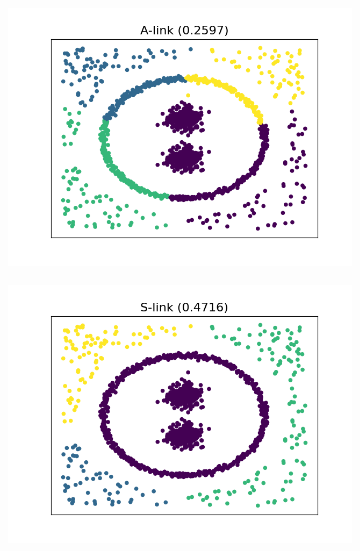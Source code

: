 \begin{figure}[htb]
    \centering
    \begin{subfigure}[b]{0.32\textwidth}
        \centering
        \includegraphics[width=\textwidth]{../results/plots/dataset_0/A-link_clustering.png}
    \end{subfigure}
    \hfill
    \begin{subfigure}[b]{0.32\textwidth}
        \centering
        \includegraphics[width=\textwidth]{../results/plots/dataset_0/S-link_clustering.png}
    \end{subfigure}
    \hfill
    \begin{subfigure}[b]{0.32\textwidth}
        \centering

\end{subfigure}
\end{figure}
